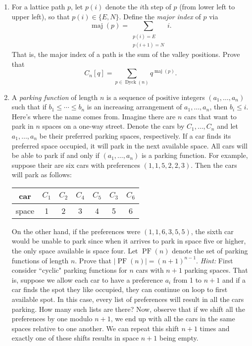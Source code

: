 \documentclass[11pt]{article}
\theoremstyle{definition}
\DeclareMathOperator{\Dyck}{Dyck}
\DeclareMathOperator{\maj}{maj}
\DeclareMathOperator{\PF}{PF}
\begin{document}
\begin{enumerate}
\item For a lattice path $p$, let $p(i)$ denote the $i$th step of $p$ (from lower left to upper left), so that $p(i)\in\{E,N\}$. Define the \emph{major index} of $p$ via
\[
\maj(p)=\sum_{\substack{p(i)=E \\ p(i+1)=N}}i.
\]
That is, the major index of a path is the sum of the valley positions.  Prove that
\[
C_n[q]=\sum_{p\in\Dyck(n)}q^{\maj(p)}.
\]

\item A \emph{parking function} of length $n$ is a sequence of positive integers $(a_1,\ldots,a_n)$ such that if $b_1\leq \cdots \leq b_n$ is an increasing arrangement of $a_1,\ldots, a_n$, then $b_i\leq i$.  Here's where the name comes from.  Imagine there are $n$ cars that want to park in $n$ spaces on a one-way street.  Denote the cars by $C_1,\ldots, C_n$ and let $a_1,\ldots,a_n$ be their preferred parking spaces, respectively. If a car finds its preferred space occupied, it will park in the next available space.  All cars will be able to park if and only if $(a_1,\ldots,a_n)$ is a parking function.  For example, suppose their are six cars with preferences $(1,1,5,2,2,3)$.  Then the cars will park as follows:
\begin{center}
\begin{tabular}{c|cccccc}
car & $C_1$ & $C_2$ & $C_4$ & $C_5$ & $C_3$ & $C_6$\\
\hline
space & 1 & 2 & 3 & 4 & 5 & 6
\end{tabular}
\end{center}

On the other hand, if the preferences were $(1,1,6,3,5,5)$, the sixth car would be unable to park since when it arrives to park in space five or higher, the only space available is space four. Let $\PF(n)$ denote the set of parking functions of length $n$.  Prove that $|\PF(n)|=(n+1)^{n-1}$. \emph{Hint:} First consider ``cyclic" parking functions for $n$ cars with $n+1$ parking spaces.  That is, suppose we allow each car to have a preference $a_i$ from 1 to $n+1$ and if a car finds the spot they like occupied, they can continue on loop to first available spot.  In this case, every list of preferences will result in all the cars parking.  How many such lists are there?  Now, observe that if we shift all the preferences by one modulo $n+1$, we end up with all the cars in the same spaces relative to one another. We can repeat this shift $n+1$ times and exactly one of these shifts results in space $n+1$ being empty.

\end{enumerate}
\end{document}
